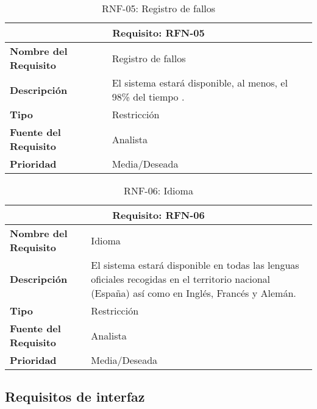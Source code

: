 \begin{table}[H]
\begin{center}
\begin{tabular}{p{} p{7cm}}
\multicolumn{2}{c}{\textbf{Requisito: RFN-05} } \\
\hline \hline
\textbf{Nombre del Requisito} &  Registro de fallos \\
\hline
\textbf{Descripción} & El sistema estará disponible, al menos, el 98\% del tiempo .\\
\hline
\textbf{Tipo} & Restricción \\
\hline
\textbf{Fuente del Requisito} &  Analista \\
\hline
\textbf{Prioridad} &  Media/Deseada \\ \hline
\end{tabular}
\caption{RNF-05: Registro de fallos}
\label{tab:RFN-05}
\end{center}
\end{table}

\begin{table}[H]
\begin{center}
\begin{tabular}{p{} p{7cm}}
\multicolumn{2}{c}{\textbf{Requisito: RFN-06} } \\
\hline \hline
\textbf{Nombre del Requisito} &  Idioma \\
\hline
\textbf{Descripción} & El sistema estará disponible en todas las lenguas oficiales recogidas en el territorio nacional (España) así como en Inglés, Francés y Alemán. \\
\hline
\textbf{Tipo} & Restricción \\
\hline
\textbf{Fuente del Requisito} &  Analista \\
\hline
\textbf{Prioridad} &  Media/Deseada \\ \hline
\end{tabular}
\caption{RNF-06: Idioma}
\label{tab:RFN-06}
\end{center}
\end{table}


\subsection{Requisitos de interfaz}
